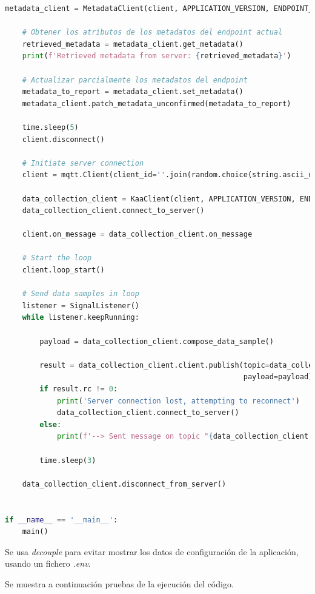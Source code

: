{\begin{lstlisting}[language=Python]
    metadata_client = MetadataClient(client, APPLICATION_VERSION, ENDPOINT_TOKEN)

    # Obtener los atributos de los metadatos del endpoint actual
    retrieved_metadata = metadata_client.get_metadata()
    print(f'Retrieved metadata from server: {retrieved_metadata}')

    # Actualizar parcialmente los metadatos del endpoint
    metadata_to_report = metadata_client.set_metadata()
    metadata_client.patch_metadata_unconfirmed(metadata_to_report)

    time.sleep(5)
    client.disconnect()

    # Initiate server connection
    client = mqtt.Client(client_id=''.join(random.choice(string.ascii_uppercase + string.digits) for _ in range(6)))

    data_collection_client = KaaClient(client, APPLICATION_VERSION, ENDPOINT_TOKEN, KPC_HOST, KPC_PORT)
    data_collection_client.connect_to_server()

    client.on_message = data_collection_client.on_message

    # Start the loop
    client.loop_start()

    # Send data samples in loop
    listener = SignalListener()
    while listener.keepRunning:

        payload = data_collection_client.compose_data_sample()

        result = data_collection_client.client.publish(topic=data_collection_client.data_collection_topic,
                                                       payload=payload)
        if result.rc != 0:
            print('Server connection lost, attempting to reconnect')
            data_collection_client.connect_to_server()
        else:
            print(f'--> Sent message on topic "{data_collection_client.data_collection_topic}":\n{payload}')

        time.sleep(3)

    data_collection_client.disconnect_from_server()


if __name__ == '__main__':
    main()


\end{lstlisting}

Se usa \textit{decouple} para evitar mostrar los datos de configuración de la aplicación, usando un fichero \textit{.env}.

Se muestra a continuación pruebas de la ejecución del código.


}
